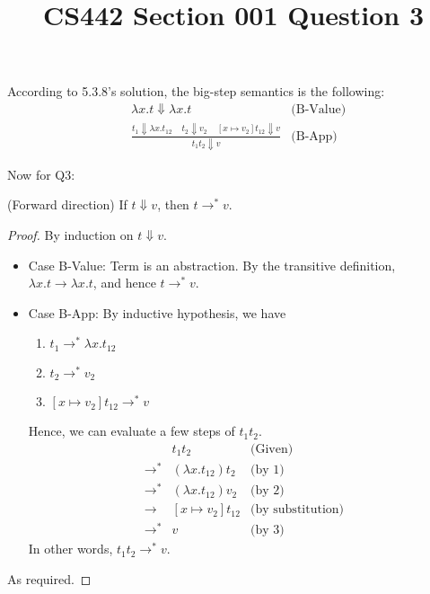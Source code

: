 \documentclass[12pt]{article}
\title{CS442 Section 001 Question 3}
\begin{document}
\maketitle

According to 5.3.8's solution, the big-step semantics is the following:
\begin{align*}
& \lambda x . t \Downarrow \lambda x . t & \text{(B-Value)} \\
& \frac{t_1 \Downarrow \lambda x . t_{12} \;\;\;\; t_2 \Downarrow v_2 \;\;\;\; [x \mapsto v_2] t_{12} \Downarrow v} {t_1t_2 \Downarrow v} & \text{(B-App)}
\end{align*}

Now for Q3:
\begin{claim}
(Forward direction) If $t \Downarrow v$, then $t \rightarrow^* v$.
\end{claim}
\begin{proof}
By induction on $t \Downarrow v$.
\begin{itemize}
\item
Case B-Value:
Term is an abstraction.
By the transitive definition, $\lambda x . t \rightarrow \lambda x . t$, and hence $t \rightarrow^* v$.
\item
Case B-App: 
By inductive hypothesis, we have
\begin{enumerate}
\item
$t_1 \rightarrow^* \lambda x . t_{12}$
\item
$t_2 \rightarrow^* v_2$
\item
$[x \mapsto v_2] t_{12} \rightarrow^* v$
\end{enumerate}
Hence, we can evaluate a few steps of $t_1t_2$.
\begin{align*}
& t_1t_2 & \text{(Given)} \\
\rightarrow^* & (\lambda x . t_{12}) t_2 & \text{(by 1)}\\
\rightarrow^* & (\lambda x . t_{12}) v_2 & \text{(by 2)}\\
\rightarrow & [x \mapsto v_2] t_{12} & \text{(by substitution)} \\
\rightarrow^* & v & \text{(by 3)}
\end{align*}
In other words, $t_1t_2 \rightarrow^* v$.
\end{itemize}
As required.
\end{proof}
\end{document}
